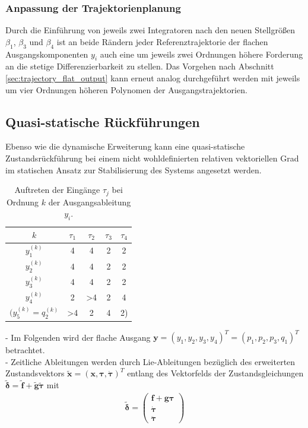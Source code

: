 \subsubsection{Anpassung der Trajektorienplanung}
Durch die Einführung von jeweils zwei Integratoren nach den neuen Stellgrößen $\beta_1$, $\beta_3$ und $\beta_4$ ist an beide Rändern jeder Referenztrajektorie der flachen Ausgangskomponenten $y_i$ auch eine um  jeweils zwei Ordnungen höhere Forderung an die stetige Differenzierbarkeit zu stellen. Das Vorgehen nach Abschnitt \ref{sec:trajectory_flat_output} kann erneut analog durchgeführt werden mit jeweils um vier Ordnungen höheren Polynomen der Ausgangstrajektorien.

\subsection{Quasi-statische Rückführungen}
Ebenso wie die dynamische Erweiterung kann eine quasi-statische Zustandsrückführung bei einem nicht wohldefinierten relativen vektoriellen Grad im statischen Ansatz \cite[S. 206]{NLRT_Roebenack} zur Stabilisierung des Systems angesetzt werden.

\begin{table}[htbp]%
	\centering
	\caption{Auftreten der Eingänge $\tau_j$ bei Ordnung $k$ der Ausgangsableitung $y_i$.}
	\label{tab:input_occurence}
	\begin{tabular}{ c| c c c c } 
		$k$ & $\tau_1$ & $\tau_2$ & $\tau_3$ & $\tau_4$ \\ 
		\hline
		$y_1^{(k)}$ & 4 & 4 & 2 & 2\\ 
		$y_2^{(k)}$ & 4 & 4 & 2 & 2\\
		$y_3^{(k)}$ & 4 & 4 & 2 & 2\\		
		$y_4^{(k)}$ & 2 & >4 & 2 & 4\\
		$(y_5^{(k)} = q_2^{(k)}$ & >4 & 2 & 4 & 2)\\
		\bottomrule
	\end{tabular}
\end{table}

- Im Folgenden wird der flache Ausgang $\mathbf{y} = (y_1, y_2, y_3, y_4)^T = (p_1, p_2, p_3, q_1)^T$ betrachtet. \\
- Zeitliche Ableitungen werden durch Lie-Ableitungen bezüglich des erweiterten Zustandsvektors $\tilde{\mathbf{x}} = (\mathbf{x}, \boldsymbol{\tau}, \dot{\boldsymbol{\tau}})^T$ entlang des Vektorfelds der Zustandsgleichungen $\tilde{\boldsymbol{\delta}} = \tilde{\mathbf{f}} + \tilde{\mathbf{g}} \tilde{\boldsymbol{\tau}}$ mit
\begin{align}
\tilde{\boldsymbol{\delta}} =
\left(\begin{matrix}
\mathbf{f} + \mathbf{g} \boldsymbol{\tau}\\
\dot{\boldsymbol{\tau}} \\
\ddot{\boldsymbol{\tau}}
\end{matrix}\right)
\end{align}

